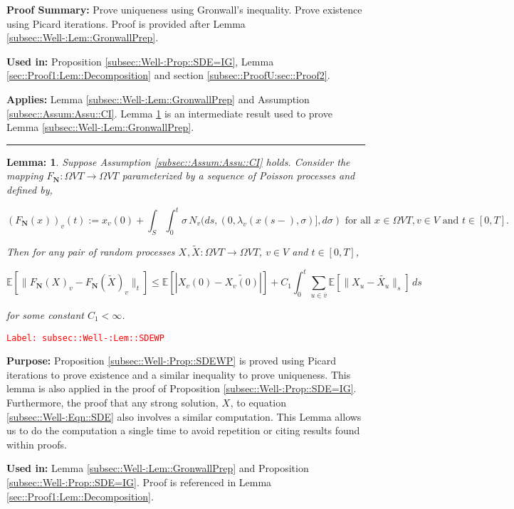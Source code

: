 \documentclass[12pt]{article}
\newcommand{\mb}{\mathbb}
\newcommand{\ra}{\rightarrow}
\newcommand{\ov}{\overline}
\newcommand{\te}{\text}
\newcommand{\tr}{\textcolor{red}}
\newcommand{\labe}[1]{\tr{\texttt{Label: #1}}}
\newcommand{\purpose}{\textbf{Purpose: }}
\newcommand{\pfsum}{\textbf{Proof Summary: }}
\newcommand{\usein}{\textbf{Used in: }}
\newcommand{\app}{\textbf{Applies: }}
\newcommand{\lin}{\rule{\linewidth}{0.4 pt}}
\newcommand{\ex}[1]{\mb{E}\left[#1\right]}			%
\renewcommand{\v}{v}							%
\newcommand{\vv}{u}								%
\renewcommand{\S}{S}							%
\newcommand{\s}{\sigma}							%
\newcommand{\T}{T}								%
\renewcommand{\t}{t}							%
\newcommand{\cl}{\ov}							%
\newcommand{\poiss}[1]{N_{#1}}						%
\newcommand{\poisses}{\mathbf{N}}				%
\newcommand{\V}{V}									%
\renewcommand{\tt}{s}								%
\newcommand{\xvt}[2]{x_{#1}{(#2)}}					%
\newcommand{\rxvt}[2]{X_{#1}{(#2)}}					%
\newcommand{\xvts}[2]{x_{#1}{#2}}					%
\newcommand{\rxvts}[2]{X_{#1}{#2}}					%
\newcommand{\rate}[1]{\lambda_{#1}}					%
\newcommand{\const}[1]{C_{#1}}						%
\newcommand{\alt}{\widetilde}						%
\newtheorem{lem}[thms]{Lemma: }
\begin{document}
\pfsum Prove uniqueness using Gronwall's inequality. Prove existence using Picard iterations. Proof is provided after Lemma \ref{subsec::Well-:Lem::GronwallPrep}.

\usein Proposition \ref{subsec::Well-:Prop::SDE=IG}, Lemma \ref{sec::Proof1:Lem::Decomposition} and section \ref{subsec::ProofU:sec::Proof2}.

\app Lemma \ref{subsec::Well-:Lem::GronwallPrep} and Assumption \ref{subsec::Assum:Assu::CI}. Lemma \ref{subsec::Well-:Lem::SDEWP} is an intermediate result used to prove Lemma \ref{subsec::Well-:Lem::GronwallPrep}.

\lin

\begin{lem}
Suppose Assumption \ref{subsec::Assum:Assu::CI} holds. Consider the mapping \(F_\poisses: \Omega{\V}{\T} \ra \Omega{\V}{\T}\) parameterized by a sequence of Poisson processes and defined by,

\[\left(F_\poisses(\xvts{}{})\right)_\v(\t) := \xvt{\v}{0} + \int_\S\int_0^\t \s \,\poiss{\v}(d\tt,(0,\rate{\v}(\xvt{}{\tt-},\s)],d\s) \te{ for all }\xvts{}{} \in \Omega{\V}{\T}, \v \in \V\te{ and }\t \in [0,\T].\]

Then for any pair of random processes \(\rxvts{}{},\alt{\rxvts{}{}}:\Omega{\V}{\T} \ra \Omega{\V}{\T}\), \(\v\in \V\) and \(\t \in [0,\T]\),

\[\ex{\|F_\poisses(\rxvts{}{})_\v - F_\poisses(\alt{\rxvts{}{}})_\v\|_\t} \leq \ex{|\rxvt{\v}{0} - \alt{\rxvt{\v}{0}}|} +  \const{1}\int_0^\t \sum_{\vv\in \cl{\v}} \ex{\|\rxvts{\vv}{} - \alt{\rxvts{\vv}{}}\|_\tt}\,d\tt\]

for some constant \(\const{1} < \infty\).

\label{subsec::Well-:Lem::SDEWP}
\end{lem}
\labe{subsec::Well-:Lem::SDEWP}

\purpose Proposition \ref{subsec::Well-:Prop::SDEWP} is proved using Picard iterations to prove existence and a similar inequality to prove uniqueness. This lemma is also applied in the proof of Proposition \ref{subsec::Well-:Prop::SDE=IG}. Furthermore, the proof that any strong solution, \(\rxvts{}{}\), to equation \eqref{subsec::Well-:Eqn::SDE} also involves a similar computation. This Lemma allows us to do the computation a single time to avoid repetition or citing results found within proofs.

\usein Lemma \ref{subsec::Well-:Lem::GronwallPrep} and Proposition \ref{subsec::Well-:Prop::SDE=IG}. Proof is referenced in Lemma \ref{sec::Proof1:Lem::Decomposition}.
\end{document}
